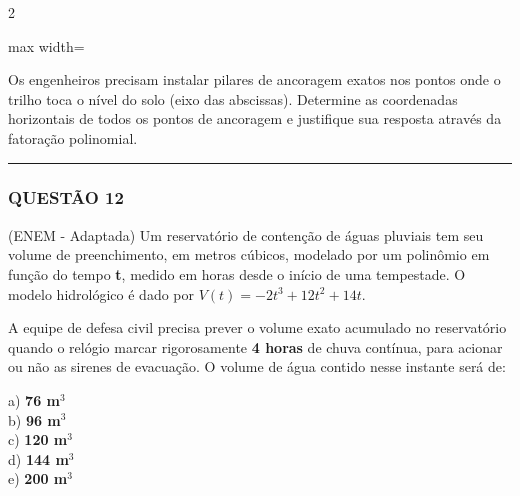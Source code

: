 \documentclass[11pt, a4paper]{article}
\begin{document}
\begin{multicols*}{2}
\begin{center}
\begin{adjustbox}{max width=\linewidth}
\end{adjustbox}
\end{center}

Os engenheiros precisam instalar pilares de ancoragem exatos nos pontos onde o trilho toca o nível do solo (eixo das abscissas). Determine as coordenadas horizontais de todos os pontos de ancoragem e justifique sua resposta através da fatoração polinomial.

\vspace{0cm} \noindent\textcolor{CorLinha}{\rule{\linewidth}{0.5pt}} \vspace{-0.2cm}
\subsubsection*{QUESTÃO 12}

(ENEM - Adaptada) Um reservatório de contenção de águas pluviais tem seu volume de preenchimento, em metros cúbicos, modelado por um polinômio em função do tempo \textbf{t}, medido em horas desde o início de uma tempestade. O modelo hidrológico é dado por $ V(t) = -2t^3 + 12t^2 + 14t $.

A equipe de defesa civil precisa prever o volume exato acumulado no reservatório quando o relógio marcar rigorosamente \textbf{4 horas} de chuva contínua, para acionar ou não as sirenes de evacuação. O volume de água contido nesse instante será de:

a) \textbf{76 m$^3$}\\[0.3cm]
b) \textbf{96 m$^3$}\\[0.3cm]
c) \textbf{120 m$^3$}\\[0.3cm]
d) \textbf{144 m$^3$}\\[0.3cm]
e) \textbf{200 m$^3$}


\end{multicols*}
\end{document}
